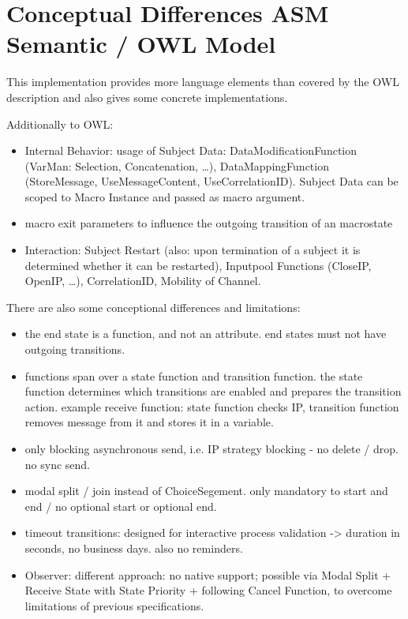 \footnotesize

\captionsetup{font=footnotesize}

\section{Conceptual Differences ASM Semantic / OWL Model}
\label{CoreASM-Reference-Implementation-Differences-OWL-Model}


This implementation provides more language elements than covered by the OWL description and also gives some concrete implementations.

Additionally to OWL:
\begin{itemize}
    \item Internal Behavior: usage of Subject Data: DataModificationFunction (VarMan: Selection, Concatenation, \ldots), DataMappingFunction (StoreMessage, UseMessageContent, UseCorrelationID).
    Subject Data can be scoped to Macro Instance and passed as macro argument.
    \item macro exit parameters to influence the outgoing transition of an macrostate
    \item Interaction: Subject Restart (also: upon termination of a subject it is determined whether it can be restarted), Inputpool Functions (CloseIP, OpenIP, \ldots), CorrelationID, Mobility of Channel.
\end{itemize}

There are also some conceptional differences and limitations:
\begin{itemize}
    \item the end state is a function, and not an attribute. end states must not have outgoing transitions.
    \item functions span over a state function and transition function. the state function determines which transitions are enabled and prepares the transition action. example receive function: state function checks IP, transition function removes message from it and stores it in a variable.
    \item only blocking asynchronous send, i.e. IP strategy blocking - no delete / drop. no sync send.
    \item modal split / join instead of ChoiceSegement. only mandatory to start and end / no optional start or optional end.
    \item timeout transitions: designed for interactive process validation -> duration in seconds, no business days. also no reminders.
    \item Observer: different approach: no native support; possible via Modal Split + Receive State with State Priority + following Cancel Function, to overcome limitations of previous specifications.
\end{itemize}


